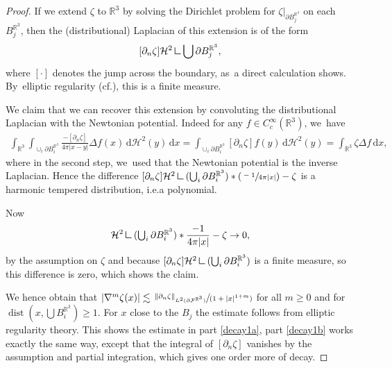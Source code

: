\documentclass[10pt]{amsart}
\newcommand{\cf}{cf.}
\newcommand{\ie}{i.e.}
\let\ts\textstyle
\newcommand{\Psfrac}[2]{(\sfrac{#1}{#2})}
\newcommand{\spfrac}[2]{\sfrac{#1}{(#2)}}
\theoremstyle{definition}
\DeclareMathOperator{\dist}{dist}
\newcommand\R{\mathbb{R}}
\newcommand\norm[1]{\left\lVert #1\right\rVert}
\newcommand\eq{=}
\newcommand\dd{\,\mathrm{d}}
\newcommand\dx{\dd x}
\newcommand{\mres}{\mathbin{\vrule height 1.6ex depth 0pt width
0.13ex\vrule height 0.13ex depth 0pt width 1.3ex}}
\let\de\partial
\begin{document}
\begin{proof}
If we extend $\zeta$ to $\R^3$ by solving the Dirichlet problem for $\zeta|_{\de B_j^{\R^3}}$ on each~$B_j^{\R^3}$, then the (distributional) Laplacian of this extension is of the form
\[
[\de_n\zeta]\mathcal{H}^2\mres{ \bigcup \de B_j^{\R^3}},
\]
 where $[\cdot]$ denotes the jump across the boundary, as~a direct calculation shows. By~elliptic regularity (\cf \cite[Chap.\,2]{grisvard2011elliptic}), this is a finite measure.

We claim that we can recover this extension by convoluting the distributional Laplacian with the Newtonian potential. Indeed for any $f\in C_c^\infty(\R^3)$, we~have
\begin{align*}
\int_{\R^3}\int_{\cup_i\de B_i^{\R^3}}\frac{-[\de_n\zeta]}{4\pi|x-y|}\Delta f(x)\,\text{d}\mathcal{H}^2(y)\dx\eq\int_{\cup_i\de B_i^{\R^3}}[\de_n\zeta]f(y)\,\text{d}\mathcal{H}^2(y)\eq \int_{\R^3}\zeta \Delta f\dx,
\end{align*}
where in the second step, we~used that the Newtonian potential is the inverse Laplacian. Hence the difference $[\de_n\zeta]\mathcal{H}^2\mres(\bigcup_i\de B_i^{\R^3})*\Psfrac{-1}{4\pi|x|}-\zeta$ is a harmonic tempered distribution, \ie a polynomial.

Now
\begin{align*}
[\de_n\zeta]\mathcal{H}^2\mres({\ts\bigcup_i\de B_i^{\R^3}})*\frac{-1}{4\pi|x|}-\zeta\to 0,
\end{align*}
by the assumption on $\zeta$ and because $[\de_n\zeta]\mathcal{H}^2\mres(\bigcup_i\de B_i^{\R^3})$ is a finite measure, so this difference is zero, which shows the claim.

We hence obtain that $|\nabla^m\zeta(x)|\lesssim\spfrac{\norm{\de_n\zeta}_{L^2(\de\mathcal{F}^{\R^3})}}{1+|x|^{1+m}}$ for all $m\geq0$ and for $\dist(x,\bigcup B_i^{\R^3})\geq 1$. For $x$ close to the $B_j$ the estimate follows from elliptic regularity theory. This shows the estimate in part \eqref{decay1a}, part \eqref{decay1b} works exactly the same way, except that the integral of $[\de_n\zeta]$ vanishes by the assumption and partial integration, which gives one order more of decay.


\end{proof}
\end{document}
